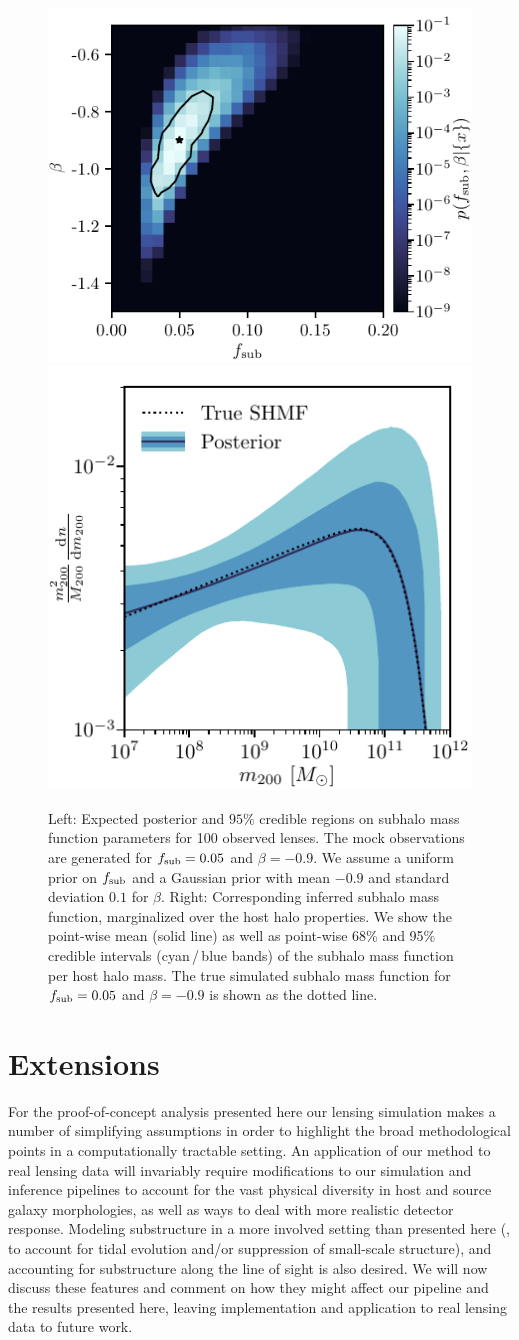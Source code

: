 \documentclass[twocolumn]{aastex62}
\begin{document}
\begin{figure}[t!]
\centering
\includegraphics[height=0.4\textwidth]{figures/posterior}%
\hspace*{0.075\textwidth}%
\includegraphics[height=0.4\textwidth]{figures/shmf}%
\hspace*{0.052\textwidth}%
\caption{Left: Expected posterior and $95\%$ credible regions on subhalo mass function parameters for 100 observed lenses. The mock observations are generated for $f_{\mathrm{sub}} = 0.05$ and $\beta = -0.9$. We assume a uniform prior on $f_{\mathrm{sub}}$ and a Gaussian prior with mean $-0.9$ and standard deviation $0.1$ for $\beta$. Right: Corresponding inferred subhalo mass function, marginalized over the host halo properties. We show the point-wise mean (solid line) as well as point-wise 68\% and 95\% credible intervals (cyan\,/\,blue bands) of the subhalo mass function per host halo mass. The true simulated subhalo mass function for $f_{\mathrm{sub}} = 0.05$ and $\beta = -0.9$ is shown as the dotted line.}
\label{fig:bayesian_post}
\end{figure}

\section{Extensions}
\label{sec:extensions}
%
For the proof-of-concept analysis presented here our lensing simulation makes a number of simplifying assumptions in order to highlight the broad methodological points in a computationally tractable setting. An application of our method to real lensing data will invariably require modifications to our simulation and inference pipelines to account for the vast physical diversity in host and source galaxy morphologies, as well as ways to deal with more realistic detector response. Modeling substructure in a more involved setting than presented here (\eg, to account for tidal evolution and/or suppression of small-scale structure), and accounting for substructure along the line of sight is also desired. We will now discuss these features and comment on how they might affect our pipeline and the results presented here, leaving implementation and application to real lensing data to future work.
\end{document}
